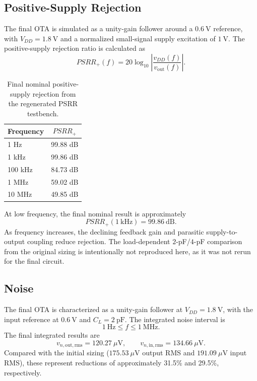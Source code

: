\subsection{Positive-Supply Rejection}

The final OTA is simulated as a unity-gain follower around a
$0.6~\mathrm{V}$ reference, with $V_{DD}=1.8~\mathrm{V}$ and a
normalized small-signal supply excitation of $1~\mathrm{V}$.
The positive-supply rejection ratio is calculated as
\[
PSRR_+(f)=20\log_{10}\left|\frac{v_{DD}(f)}{v_{\mathrm{out}}(f)}\right|.
\]

\begin{table}[ht]
    \centering
    \caption{Final nominal positive-supply rejection from the
    regenerated PSRR testbench.}
    \label{tab:psrr_plus}
    \begin{tabular}{lc}
        \hline
        Frequency & $PSRR_+$ \\
        \hline
        1 Hz     & 99.88 dB \\
        1 kHz    & 99.86 dB \\
        100 kHz  & 84.73 dB \\
        1 MHz    & 59.02 dB \\
        10 MHz   & 49.85 dB \\
        \hline
    \end{tabular}
\end{table}

At low frequency, the final nominal result is approximately
\[
\boxed{PSRR_+(1~\mathrm{kHz})=99.86~\mathrm{dB}}.
\]
As frequency increases, the declining feedback gain and parasitic
supply-to-output coupling reduce rejection. The load-dependent
$2$-pF/$4$-pF comparison from the original sizing is intentionally not
reproduced here, as it was not rerun for the final circuit.

\subsection{Noise}

The final OTA is characterized as a unity-gain follower at
$V_{DD}=1.8~\mathrm{V}$, with the input reference at $0.6~\mathrm{V}$
and $C_L=2~\mathrm{pF}$. The integrated noise interval is
\[
1~\mathrm{Hz}\le f\le1~\mathrm{MHz}.
\]
The final integrated results are
\[
\boxed{v_{n,\mathrm{out,rms}}=120.27~\mu\mathrm{V}},
\qquad
\boxed{v_{n,\mathrm{in,rms}}=134.66~\mu\mathrm{V}}.
\]
Compared with the initial sizing ($175.53~\mu\mathrm{V}$ output RMS
and $191.09~\mu\mathrm{V}$ input RMS), these represent reductions of
approximately 31.5\% and 29.5\%, respectively.

